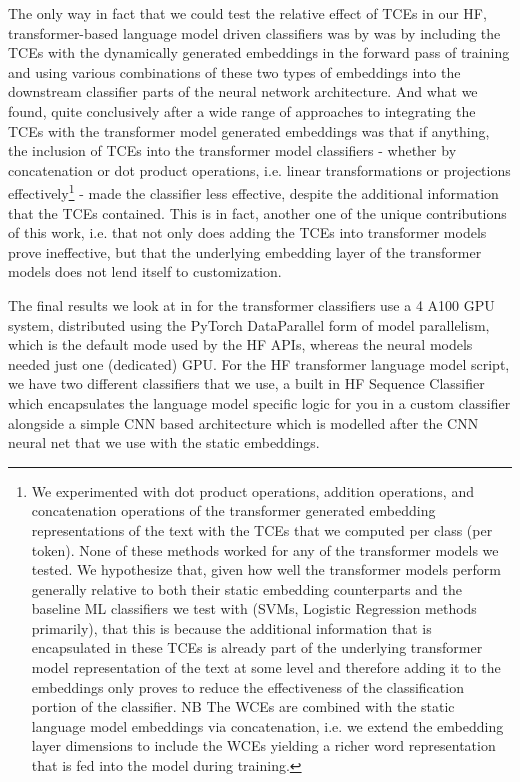 \documentclass[final]{clv2025-revised}
\begin{document}
The only way in fact that we could test the relative effect of TCEs in our HF, transformer-based language model driven classifiers was by was by including the TCEs with the dynamically generated embeddings in the forward pass of training and using various combinations of these two types of embeddings into the downstream classifier parts of the neural network architecture. And what we found, quite conclusively after a wide range of approaches to integrating the TCEs with the transformer model generated embeddings was that if anything, the inclusion of TCEs into the transformer model classifiers - whether by concatenation or dot product operations, i.e. linear transformations or projections effectively\footnote{We experimented with dot product operations, addition operations, and concatenation operations of the transformer generated embedding representations of the text with the TCEs that we computed per class (per token). None of these methods worked for any of the transformer models we tested. We hypothesize that, given how well the transformer models perform generally relative to both their static embedding counterparts and the baseline ML classifiers we test with (SVMs, Logistic Regression methods primarily), that this is because the additional information that is encapsulated in these TCEs is already part of the underlying transformer model representation of the text at some level and therefore adding it to the embeddings only proves to reduce the effectiveness of the classification portion of the classifier. NB The WCEs are combined with the static language model embeddings via concatenation, i.e. we extend the embedding layer dimensions to include the WCEs yielding a richer word representation that is fed into the model during training.} - made the classifier less effective, despite the additional information that the TCEs contained. This is in fact, another one of the unique contributions of this work, i.e. that not only does adding the TCEs into transformer models prove ineffective, but that the underlying embedding layer of the transformer models does not lend itself to customization.

The final results we look at in for the transformer classifiers use a 4 A100 GPU system, distributed using the PyTorch DataParallel form of model parallelism, which is the default mode used by the HF APIs, whereas the neural models needed just one (dedicated) GPU. For the HF transformer language model script, we have two different classifiers that we use, a built in HF Sequence Classifier which encapsulates the language model specific logic for you in a custom classifier alongside a simple CNN based architecture which is modelled after the CNN neural net that we use with the static embeddings.
\end{document}
